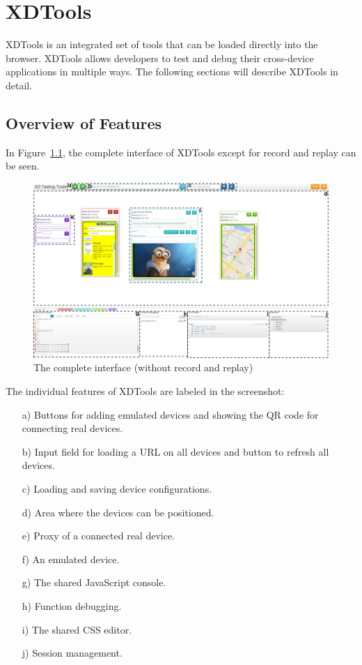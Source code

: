 \chapter{XDTools}

XDTools is an integrated set of tools that can be loaded directly into the browser. XDTools allows developers to test and debug their cross-device applications in multiple ways. The following sections will describe XDTools in detail.

\section{Overview of Features}

In Figure~\ref{fig:complete}, the complete interface of XDTools except for record and replay can be seen.

\begin{figure}[H]
  \centering
    \includegraphics[width=1.0\textwidth]{images/screenshots/complete_3.png}
	\caption[Screenshot: Complete Interface]{The complete interface (without record and replay)}
	\label{fig:complete}
\end{figure}

The individual features of XDTools are labeled in the screenshot:
\begin{itemize}
	\item [a)] Buttons for adding emulated devices and showing the QR code for connecting real devices.
	\item [b)] Input field for loading a URL on all devices and button to refresh all devices.
	\item [c)] Loading and saving device configurations.
	\item [d)] Area where the devices can be positioned.
	\item [e)] Proxy of a connected real device.
	\item [f)] An emulated device.
	\item [g)] The shared JavaScript console.
	\item [h)] Function debugging.
	\item [i)] The shared CSS editor.
	\item [j)] Session management.
\end{itemize}


